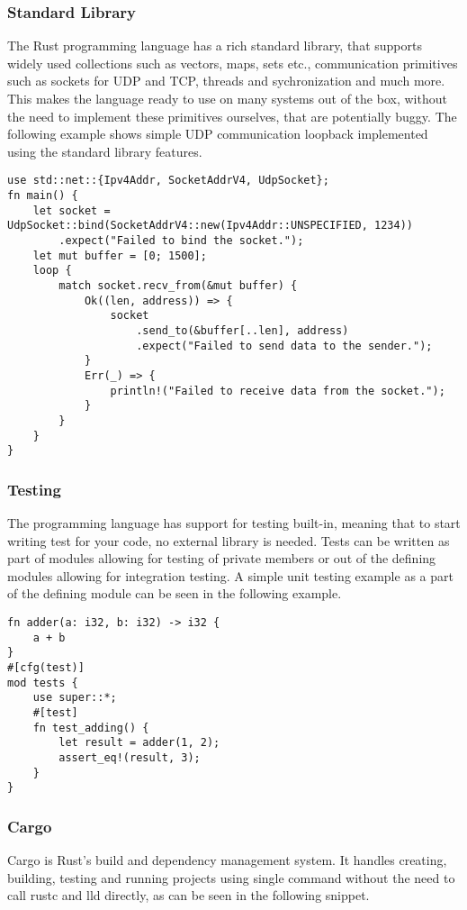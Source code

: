 \subsubsection{Standard Library}
The Rust programming language has a rich standard library, that supports widely used collections such as vectors, maps, sets etc., communication primitives such as sockets for UDP and TCP, threads and sychronization and much more.
This makes the language ready to use on many systems out of the box, without the need to implement these primitives ourselves, that are potentially buggy.
The following example shows simple UDP communication loopback implemented using the standard library features.

\begin{lstlisting}
use std::net::{Ipv4Addr, SocketAddrV4, UdpSocket};
fn main() {
    let socket = UdpSocket::bind(SocketAddrV4::new(Ipv4Addr::UNSPECIFIED, 1234))
        .expect("Failed to bind the socket.");
    let mut buffer = [0; 1500];
    loop {
        match socket.recv_from(&mut buffer) {
            Ok((len, address)) => {
                socket
                    .send_to(&buffer[..len], address)
                    .expect("Failed to send data to the sender.");
            }
            Err(_) => {
                println!("Failed to receive data from the socket.");
            }
        }
    }
}
\end{lstlisting}

\subsubsection{Testing}
The programming language has support for testing built-in, meaning that to start writing test for your code, no external library is needed.
Tests can be written as part of modules allowing for testing of private members or out of the defining modules allowing for integration testing.
A simple unit testing example as a part of the defining module can be seen in the following example.

\begin{lstlisting}
fn adder(a: i32, b: i32) -> i32 {
    a + b
}
#[cfg(test)]
mod tests {
    use super::*;
    #[test]
    fn test_adding() {
        let result = adder(1, 2);
        assert_eq!(result, 3);
    }
}
\end{lstlisting}

\newpage
\subsubsection{Cargo}
Cargo is Rust's build and dependency management system.
It handles creating, building, testing and running projects using single command without the need to call rustc and lld directly, as can be seen in the following snippet.

